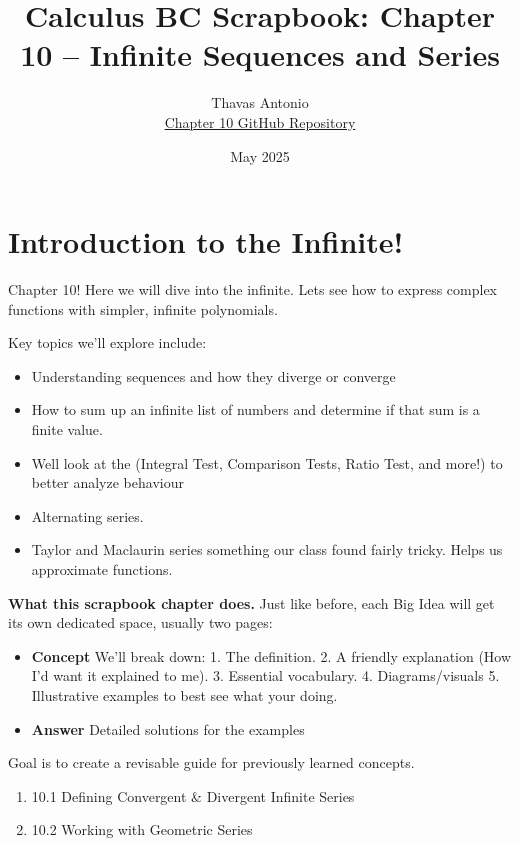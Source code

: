 \documentclass{article}
\title{\textbf{Calculus BC Scrapbook: Chapter 10 – Infinite Sequences and Series}}
\author{
  Thavas Antonio\\
  \small\href{https://github.com/BuddyBob/Chapter10}{Chapter 10 GitHub Repository} %
}
\date{May 2025} %
\begin{document}
\maketitle
\tableofcontents %
\newpage

\section{Introduction to the Infinite!}

Chapter 10! Here we will dive into the infinite. Lets see how to express complex functions with simpler, infinite polynomials.

Key topics we'll explore include:
\begin{itemize}
    \item Understanding sequences and how they diverge or converge
    \item How to sum up an infinite list of numbers and determine if that sum is a finite value.
    \item Well look at the (Integral Test, Comparison Tests, Ratio Test, and more!) to better analyze behaviour
    \item Alternating series.
    \item Taylor and Maclaurin series something our class found fairly tricky. Helps us approximate functions. 
\end{itemize}

\medskip
\noindent
\textbf{What this scrapbook chapter does.} Just like before, each Big Idea will get its own dedicated space, usually two pages:

\begin{itemize}
  \item \textbf{Concept} We'll break down: 1. The definition. 2. A friendly explanation (How I'd want it explained to me). 3. Essential vocabulary. 4. Diagrams/visuals 5. Illustrative examples to best see what your doing.
  \item \textbf{Answer} Detailed solutions for the examples
\end{itemize}

Goal is to create a revisable guide for previously learned concepts. 

\vspace{10pt}


\begin{tcolorbox}[title=Chapter 10 Road-Map: All 15 Infinite-Series Big Ideas,
                  colback=gray!8, colframe=purple!70!black]

\begin{enumerate}[itemsep=3pt, topsep=2pt] 
  \item 10.1  Defining Convergent \& Divergent Infinite Series
  \item 10.2  Working with Geometric Series
\end{enumerate}

\end{tcolorbox}
\newpage
\end{document}
